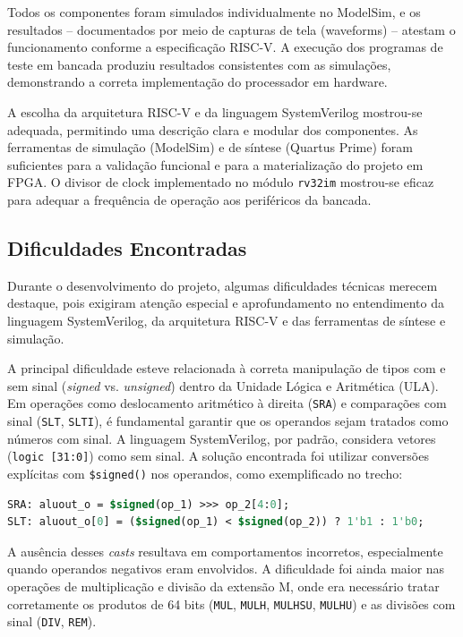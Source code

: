 \documentclass[
	12pt,				%
	oneside,
	a4paper,			%
	english,			%
	french,				%
	spanish,			%
	brazil,				%
	]{abntex2}
\begin{document}
Todos os componentes foram simulados individualmente no ModelSim, e os resultados – documentados por meio de capturas de tela (waveforms) – atestam o funcionamento conforme a especificação RISC-V. A execução dos programas de teste em bancada produziu resultados consistentes com as simulações, demonstrando a correta implementação do processador em hardware.

A escolha da arquitetura RISC-V e da linguagem SystemVerilog mostrou-se adequada, permitindo uma descrição clara e modular dos componentes. As ferramentas de simulação (ModelSim) e de síntese (Quartus Prime) foram suficientes para a validação funcional e para a materialização do projeto em FPGA. O divisor de clock implementado no módulo \texttt{rv32im} mostrou-se eficaz para adequar a frequência de operação aos periféricos da bancada.

\subsection{Dificuldades Encontradas}

Durante o desenvolvimento do projeto, algumas dificuldades técnicas merecem destaque, pois exigiram atenção especial e aprofundamento no entendimento da linguagem SystemVerilog, da arquitetura RISC-V e das ferramentas de síntese e simulação.

A principal dificuldade esteve relacionada à correta manipulação de tipos com e sem sinal (\emph{signed} vs. \emph{unsigned}) dentro da Unidade Lógica e Aritmética (ULA). Em operações como deslocamento aritmético à direita (\texttt{SRA}) e comparações com sinal (\texttt{SLT}, \texttt{SLTI}), é fundamental garantir que os operandos sejam tratados como números com sinal. A linguagem SystemVerilog, por padrão, considera vetores (\texttt{logic [31:0]}) como sem sinal. A solução encontrada foi utilizar conversões explícitas com \texttt{\$signed()} nos operandos, como exemplificado no trecho:

\begin{lstlisting}[language=SystemVerilog]
SRA: aluout_o = $signed(op_1) >>> op_2[4:0];
SLT: aluout_o[0] = ($signed(op_1) < $signed(op_2)) ? 1'b1 : 1'b0;
\end{lstlisting}

A ausência desses \textit{casts} resultava em comportamentos incorretos, especialmente quando operandos negativos eram envolvidos. A dificuldade foi ainda maior nas operações de multiplicação e divisão da extensão M, onde era necessário tratar corretamente os produtos de 64 bits (\texttt{MUL}, \texttt{MULH}, \texttt{MULHSU}, \texttt{MULHU}) e as divisões com sinal (\texttt{DIV}, \texttt{REM}).
\end{document}
